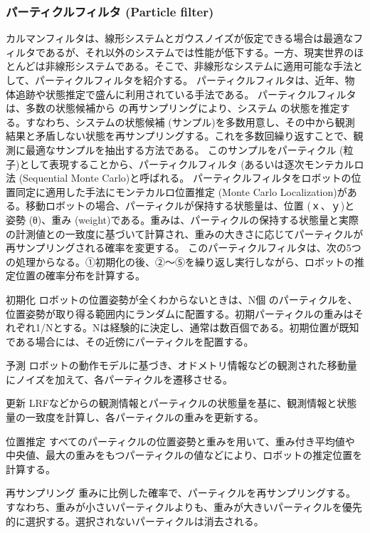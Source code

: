 \subsubsection{パーティクルフィルタ (Particle filter)}

カルマンフィルタは、線形システムとガウスノイズが仮定できる場合は最適なフィルタであるが、それ以外のシステムでは性能が低下する。一方、現実世界のほとんどは非線形システムである。そこで、非線形なシステムに適用可能な手法として、パーティクルフィルタを紹介する。
パーティクルフィルタは、近年、物体追跡や状態推定で盛んに利用されている手法である。 パーティクルフィルタは、多数の状態候補から  の再サンプリングにより、システム  の状態を推定する。すなわち、システムの状態候補 (サンプル)を多数用意し、その中から観測結果と矛盾しない状態を再サンプリングする。これを多数回繰り返すことで、観測に最適なサンプルを抽出する方法である。  このサンプルをパーティクル (粒子)として表現することから、パーティクルフィルタ (あるいは逐次モンテカルロ法 (Sequential Monte Carlo)と呼ばれる。
パーティクルフィルタをロボットの位置同定に適用した手法にモンテカルロ位置推定 (Monte Carlo Localization)がある。移動ロボットの場合、パーティクルが保持する状態量は、位置 (ｘ、ｙ)と姿勢 (θ)、重み (weight)である。重みは、パーティクルの保持する状態量と実際の計測値との一致度に基づいて計算され、重みの大きさに応じてパーティクルが再サンプリングされる確率を変更する。
このパーティクルフィルタは、次の5つの処理からなる。①初期化の後、②〜⑤を繰り返し実行しながら、ロボットの推定位置の確率分布を計算する。

\setcounter{num}{0}

\circled{\thenum} 初期化
ロボットの位置姿勢が全くわからないときは、N個  のパーティクルを、位置姿勢が取り得る範囲内にランダムに配置する。初期パーティクルの重みはそれぞれ1/Nとする。Nは経験的に決定し、通常は数百個である。初期位置が既知である場合には、その近傍にパーティクルを配置する。

\circled{\thenum} 予測
ロボットの動作モデルに基づき、オドメトリ情報などの観測された移動量にノイズを加えて、各パーティクルを遷移させる。

\circled{\thenum} 更新
LRFなどからの観測情報とパーティクルの状態量を基に、観測情報と状態量の一致度を計算し、各パーティクルの重みを更新する。

\circled{\thenum} 位置推定
すべてのパーティクルの位置姿勢と重みを用いて、重み付き平均値や中央値、最大の重みをもつパーティクルの値などにより、ロボットの推定位置を計算する。

\circled{\thenum} 再サンプリング
重みに比例した確率で、パーティクルを再サンプリングする。すなわち、重みが小さいパーティクルよりも、重みが大きいパーティクルを優先的に選択する。選択されないパーティクルは消去される。

